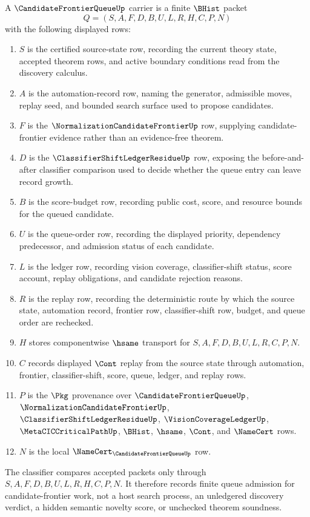 \begin{definition}
\label{def:candidate-frontier-queue-carrier}
A $\CandidateFrontierQueueUp$ carrier is a finite $\BHist$ packet
$$
Q=(S,A,F,D,B,U,L,R,H,C,P,N)
$$
with the following displayed rows:
\begin{enumerate}
\item $S$ is the certified source-state row, recording the current theory state, accepted theorem rows, and active boundary conditions read from the discovery calculus.
\item $A$ is the automation-record row, naming the generator, admissible moves, replay seed, and bounded search surface used to propose candidates.
\item $F$ is the $\NormalizationCandidateFrontierUp$ row, supplying candidate-frontier evidence rather than an evidence-free theorem.
\item $D$ is the $\ClassifierShiftLedgerResidueUp$ row, exposing the before-and-after classifier comparison used to decide whether the queue entry can leave record growth.
\item $B$ is the score-budget row, recording public cost, score, and resource bounds for the queued candidate.
\item $U$ is the queue-order row, recording the displayed priority, dependency predecessor, and admission status of each candidate.
\item $L$ is the ledger row, recording vision coverage, classifier-shift status, score account, replay obligations, and candidate rejection reasons.
\item $R$ is the replay row, recording the deterministic route by which the source state, automation record, frontier row, classifier-shift row, budget, and queue order are rechecked.
\item $H$ stores componentwise $\hsame$ transport for $S,A,F,D,B,U,L,R,C,P,N$.
\item $C$ records displayed $\Cont$ replay from the source state through automation, frontier, classifier-shift, score, queue, ledger, and replay rows.
\item $P$ is the $\Pkg$ provenance over $\CandidateFrontierQueueUp$, $\NormalizationCandidateFrontierUp$, $\ClassifierShiftLedgerResidueUp$, $\VisionCoverageLedgerUp$, $\MetaCICCriticalPathUp$, $\BHist$, $\hsame$, $\Cont$, and $\NameCert$ rows.
\item $N$ is the local $\NameCert_{\CandidateFrontierQueueUp}$ row.
\end{enumerate}
The classifier compares accepted packets only through $S,A,F,D,B,U,L,R,H,C,P,N$. It therefore records finite queue admission for candidate-frontier work, not a host search process, an unledgered discovery verdict, a hidden semantic novelty score, or unchecked theorem soundness.
\end{definition}

